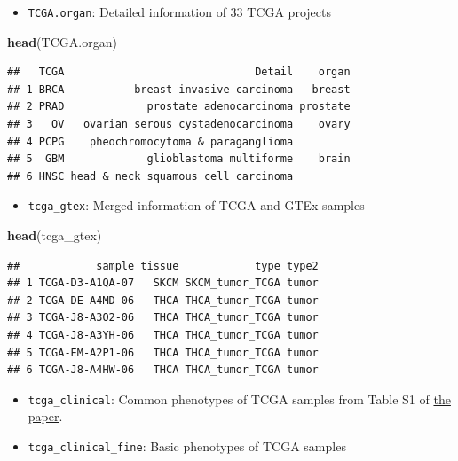 \documentclass[
]{book}
\newenvironment{Shaded}{\begin{snugshade}}{\end{snugshade}}
\newcommand{\FunctionTok}[1]{\textcolor[rgb]{0.13,0.29,0.53}{\textbf{#1}}}
\newcommand{\NormalTok}[1]{#1}
\providecommand{\tightlist}{%
  \setlength{\itemsep}{0pt}\setlength{\parskip}{0pt}}
\begin{document}
\begin{itemize}
\tightlist
\item
  \texttt{TCGA.organ}: Detailed information of 33 TCGA projects
\end{itemize}

\begin{Shaded}
\begin{Highlighting}[]
\FunctionTok{head}\NormalTok{(TCGA.organ)}
\end{Highlighting}
\end{Shaded}

\begin{verbatim}
##   TCGA                              Detail    organ
## 1 BRCA           breast invasive carcinoma   breast
## 2 PRAD             prostate adenocarcinoma prostate
## 3   OV   ovarian serous cystadenocarcinoma    ovary
## 4 PCPG    pheochromocytoma & paraganglioma         
## 5  GBM             glioblastoma multiforme    brain
## 6 HNSC head & neck squamous cell carcinoma
\end{verbatim}

\begin{itemize}
\tightlist
\item
  \texttt{tcga\_gtex}: Merged information of TCGA and GTEx samples
\end{itemize}

\begin{Shaded}
\begin{Highlighting}[]
\FunctionTok{head}\NormalTok{(tcga\_gtex)}
\end{Highlighting}
\end{Shaded}

\begin{verbatim}
##            sample tissue            type type2
## 1 TCGA-D3-A1QA-07   SKCM SKCM_tumor_TCGA tumor
## 2 TCGA-DE-A4MD-06   THCA THCA_tumor_TCGA tumor
## 3 TCGA-J8-A3O2-06   THCA THCA_tumor_TCGA tumor
## 4 TCGA-J8-A3YH-06   THCA THCA_tumor_TCGA tumor
## 5 TCGA-EM-A2P1-06   THCA THCA_tumor_TCGA tumor
## 6 TCGA-J8-A4HW-06   THCA THCA_tumor_TCGA tumor
\end{verbatim}

\begin{itemize}
\tightlist
\item
  \texttt{tcga\_clinical}: Common phenotypes of TCGA samples from Table S1 of \href{https://www.cell.com/cell/fulltext/S0092-8674(18)30229-0?_returnURL=https\%3A\%2F\%2Flinkinghub.elsevier.com\%2Fretrieve\%2Fpii\%2FS0092867418302290\%3Fshowall\%3Dtrue\#supplementaryMaterial}{the paper}.
\item
  \texttt{tcga\_clinical\_fine}: Basic phenotypes of TCGA samples
\end{itemize}
\end{document}
